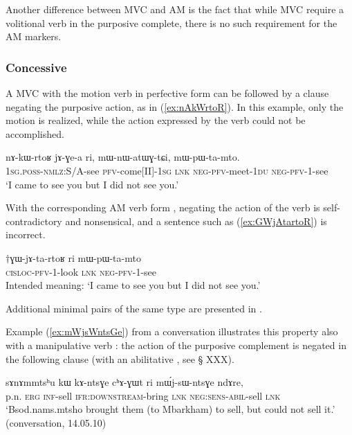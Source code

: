 Another difference between MVC and AM is the fact that while MVC require a volitional verb in the purposive complete, there is no such requirement for the AM markers.

\subsubsection{Concessive} \label{sec:am.concessive}
A MVC  with the motion verb in perfective form can be followed by a clause negating the purposive action, as in (\ref{ex:nAkWrtoR}). In this example, only the motion is realized, while the action expressed by the verb  could not be accomplished.

\begin{exe}
\ex \label{ex:nAkWrtoR}
\gll nɤ-kɯ-rtoʁ jɤ-ɣe-a ri, mɯ-nɯ-atɯɣ-tɕi, mɯ-pɯ-ta-mto. \\
\textsc{1sg.poss}-\textsc{nmlz}:S/A-see \textsc{pfv}-come[II]-\textsc{1sg} \textsc{lnk} \textsc{neg}-\textsc{pfv}-meet-\textsc{1du} \textsc{neg}-\textsc{pfv}-1-see \\
\glt `I came to see you but I did not see you.' 
\end{exe}

With the corresponding AM verb form , negating the action of the verb is self-contradictory and nonsensical, and a sentence such as (\ref{ex:GWjAtartoR}) is incorrect.

\begin{exe}
\ex \label{ex:GWjAtartoR}
\gll $\dagger$ɣɯ-jɤ-ta-rtoʁ ri mɯ-pɯ-ta-mto \\
\textsc{cisloc}-\textsc{pfv}-1-look \textsc{lnk} \textsc{neg}-\textsc{pfv}-1-see \\
\glt Intended meaning: `I came to see you but I did not see you.' 
\end{exe}

Additional minimal pairs of the same type are presented in \citet[202-203]{jacques13harmonization}.

Example (\ref{ex:mWjsWntsGe}) from a conversation illustrates this property also with a manipulative verb : the action of the purposive complement   is negated in the following clause (with an abilitative , see § XXX).

 \begin{exe}
\ex \label{ex:mWjsWntsGe}
 \gll   sɤnɤmmtsʰu kɯ kɤ-ntsɣe cʰɤ-ɣɯt ri mɯ́j-sɯ-ntsɣe ndɤre, \\
 p.n. \textsc{erg} \textsc{inf}-sell \textsc{ifr}:\textsc{downstream}-bring \textsc{lnk} \textsc{neg}:\textsc{sens}-\textsc{abil}-sell \textsc{lnk} \\
\glt `Bsod.nams.mtsho brought them (to Mbarkham) to sell, but could not sell it.' (conversation, 14.05.10)
 \end{exe}

